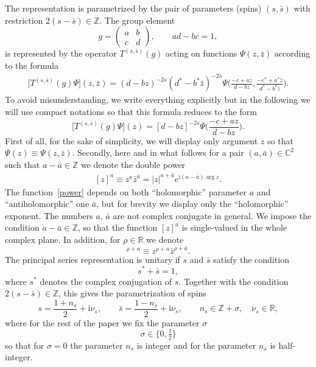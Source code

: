 \documentclass[10pt,a4paper]{amsart}
\renewcommand{\imath}{\mathrm{i}}
\numberwithin{equation}{section}
\begin{document}
The representation is parametrized by the pair of parameters (spins) $(s, \bar{s})$ with restriction $2(s - \bar{s}) \in \mathbb{Z}$.
The group element
\begin{equation*}
	g =
	\begin{pmatrix}
		a & b \\
		c & d
	\end{pmatrix}, \qquad ad - bc = 1,
\end{equation*}
is represented by the operator $T^{(s,\bar{s})}(g)$ acting on functions $\Psi(z ,\bar{z})$ according to the formula
\begin{align*}
	\bigl[T^{(s,\bar{s})}(g) \Psi\bigr] (z ,\bar{z}) =
	(d-bz)^{-2s} (d^*-b^*\bar{z})^{-2\bar{s}}
\Psi \biggl(\frac{-c+az}{d-bz} ,\frac{-c^*+a^* \bar{z}}{d^*-b^*\bar{z}}\biggr).
\end{align*}
To avoid misunderstanding, we write everything explicitly but in the following
we will use compact notations so that this formula reduces to the form
\begin{equation*}
	\bigl[T^{(s,\bar{s})}(g) \Psi\bigr] (z) =
	[d-bz]^{-2s} \Psi \biggl(\frac{-c+az}{d-bz}\biggr).
\end{equation*}
First of all, for the sake of simplicity, we will display only argument $z$
so that~\mbox{$\Psi(z) \equiv \Psi(z, \bar{z})$}.
Secondly, here and in what follows for a pair $(a,\bar{a}) \in \mathbb{C}^2$ such that $a-\bar{a} \in \mathbb{Z}$ we denote the double power
\begin{align} \label{power}
	[z]^a \equiv z^a \bar{z}^{\bar{a}} = |z|^{a+\bar{a}} {e}^{\imath(a-\bar{a}) \arg z}.
\end{align}
The function~\eqref{power} depends on both ``holomorphic'' parameter $a$ and ``antiholomorphic'' one $\bar{a}$, but for brevity we display only the ``holomorphic'' exponent. The numbers $a$, $\bar{a}$ are not complex conjugate in general. We impose the condition $a-\bar{a} \in \mathbb{Z}$, so that the function $[z]^a$ is single-valued in the whole complex plane. In addition, for $\rho \in \mathbb{R}$ we denote
\begin{equation*}
	[z]^{\rho+a} \equiv z^{\rho+a} \bar{z}^{\rho+\bar{a}} .
\end{equation*}
The principal series representation is unitary if $s$ and $\bar{s}$ satisfy the condition
\begin{equation} \label{scond}
	s^\ast + \bar{s} = 1 ,
\end{equation}
where $s^\ast$ denotes the complex conjugation of $s$. Together with the condition $2(s - \bar{s}) \in \mathbb{Z}$, this gives the parametrization of spins
\begin{equation}\label{sparam}
	s = \frac{1+n_s}{2} + \imath\nu_s, \qquad
	\bar{s} = \frac{1-n_s}{2} + \imath\nu_s ,
	\qquad
	n_s \in \mathbb{Z}+\sigma, \quad \nu_s \in \mathbb{R},
\end{equation}
where for the rest of the paper we fix the parameter $\sigma$
\begin{equation} \label{sigma}
	\sigma \in \bigl\{0, \tfrac{1}{2}\bigr\}
\end{equation}
so that for $\sigma=0$ the parameter $n_s$ is integer and for
 the parameter $n_s$ is half-integer.
\end{document}
